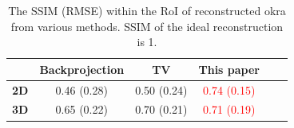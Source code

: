 \documentclass[journal]{IEEEtran}
\begin{document}

\begin{table}[!h]
  \centering
  \caption{The SSIM (RMSE) within the RoI of reconstructed okra from various
    methods. SSIM of the ideal reconstruction is 1.}
\begin{tabular}{|l|c|c|c|c|c|}
\hline &
\textbf{Backprojection} & \textbf{TV} &
\textbf{This paper} \\ \hline \textbf{2D} & 0.46 (0.28)
& 0.50 (0.24) & \textcolor{red}{0.74 (0.15)} \\ 
\hline \textbf{3D} & 0.65 (0.22) & 0.70 (0.21) & \textcolor{red}{0.71 (0.19)}
\\ \hline
\end{tabular}
\label{table:okra_ssim}
\end{table}
\end{document}
